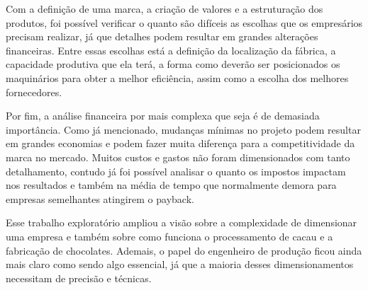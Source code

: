 \documentclass[
	12pt,				%
	openright,			%
	oneside,			%
	a4paper,			%
	english,			%
	french,				%
	spanish,			%
	brazil				%
	]{abntex2}
\begin{document}
Com a definição de uma marca, a criação de valores e a estruturação dos produtos, foi possível verificar o quanto são difíceis as escolhas que os empresários precisam realizar, já que detalhes podem resultar em grandes alterações financeiras. Entre essas escolhas está a definição da localização da fábrica, a capacidade produtiva que ela terá, a forma como deverão ser posicionados os maquinários para obter a melhor eficiência, assim como a escolha dos melhores fornecedores.

Por fim, a análise financeira por mais complexa que seja é de demasiada importância. Como já mencionado, mudanças mínimas no projeto podem resultar em grandes economias e podem fazer muita diferença para a competitividade da marca no mercado. Muitos custos e gastos não foram dimensionados com tanto detalhamento, contudo já foi possível analisar o quanto os impostos impactam nos resultados e também na média de tempo que normalmente demora para empresas semelhantes atingirem o payback.

Esse trabalho exploratório ampliou a visão sobre a complexidade de dimensionar uma empresa e também sobre como funciona o processamento de cacau e a fabricação de chocolates. Ademais, o papel do engenheiro de produção ficou ainda mais claro como sendo algo essencial, já que a maioria desses dimensionamentos necessitam de precisão e técnicas.


\newpage
\postextual



\end{document}
